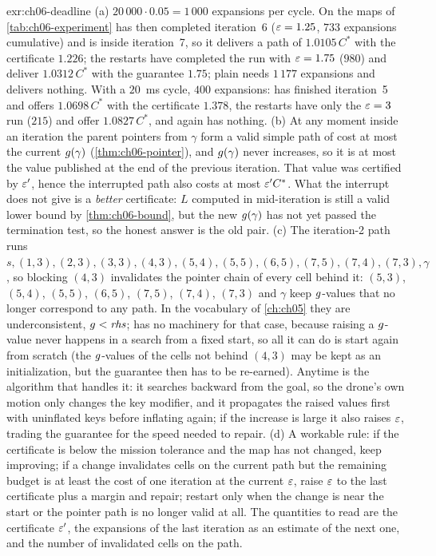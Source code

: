 \begin{solution}{exr:ch06-deadline}
(a) $20\,000 \cdot 0.05 = 1\,000$ expansions per cycle. On the maps of \cref{tab:ch06-experiment} \arastar has then completed iteration~6 ($\varepsilon = 1.25$, $733$ expansions cumulative) and is inside iteration~7, so it delivers a path of $1.0105\,C^*$ with the certificate $1.226$; the restarts have completed the run with $\varepsilon = 1.75$ ($980$) and deliver $1.0312\,C^*$ with the guarantee $1.75$; plain \astar needs $1\,177$ expansions and delivers nothing. With a $20$~ms cycle, $400$ expansions: \arastar has finished iteration~5 and offers $1.0698\,C^*$ with the certificate $1.378$, the restarts have only the $\varepsilon = 3$ run ($215$) and offer $1.0827\,C^*$, and \astar again has nothing. (b) At any moment inside an iteration the parent pointers from $\gamma$ form a valid simple path of cost at most the current $g(\gamma)$ (\cref{thm:ch06-pointer}), and $g(\gamma)$ never increases, so it is at most the value published at the end of the previous iteration. That value was certified by $\varepsilon'$, hence the interrupted path also costs at most $\varepsilon' C^*$. What the interrupt does not give is a \emph{better} certificate: $L$ computed in mid-iteration is still a valid lower bound by \cref{thm:ch06-bound}, but the new $g(\gamma)$ has not yet passed the termination test, so the honest answer is the old pair. (c) The iteration-2 path runs $s, (1,3), (2,3), (3,3), (4,3), (5,4), (5,5), (6,5), (7,5), (7,4), (7,3), \gamma$, so blocking $(4,3)$ invalidates the pointer chain of every cell behind it: $(5,3)$, $(5,4)$, $(5,5)$, $(6,5)$, $(7,5)$, $(7,4)$, $(7,3)$ and $\gamma$ keep $g$-values that no longer correspond to any path. In the vocabulary of \cref{ch:ch05} they are underconsistent, $g < \mathit{rhs}$; \arastar has no machinery for that case, because raising a $g$-value never happens in a search from a fixed start, so all it can do is start again from scratch (the $g$-values of the cells not behind $(4,3)$ may be kept as an initialization, but the guarantee then has to be re-earned). Anytime \dstar is the algorithm that handles it: it searches backward from the goal, so the drone's own motion only changes the key modifier, and it propagates the raised values first with uninflated keys before inflating again; if the increase is large it also raises $\varepsilon$, trading the guarantee for the speed needed to repair. (d) A workable rule: if the certificate is below the mission tolerance and the map has not changed, keep improving; if a change invalidates cells on the current path but the remaining budget is at least the cost of one iteration at the current $\varepsilon$, raise $\varepsilon$ to the last certificate plus a margin and repair; restart only when the change is near the start or the pointer path is no longer valid at all. The quantities to read are the certificate $\varepsilon'$, the expansions of the last iteration as an estimate of the next one, and the number of invalidated cells on the path.
\end{solution}
